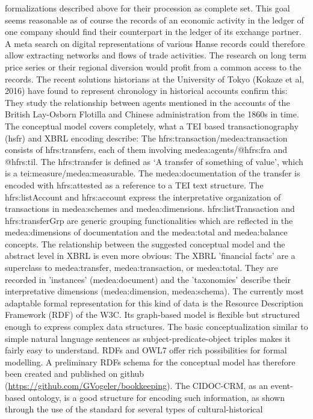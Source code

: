 \documentclass[12pt,a4paper]{article}
\begin{document}
formalizations described above for their procession as complete set. This goal seems reasonable
as of course the records of an economic activity in the ledger of one company should find their
counterpart in the ledger of its exchange partner. A meta search on digital representations of
various Hanse records could therefore allow extracting networks and flows of trade activities.
The research on long term price series or their regional diversion would profit from a common
access to the records. The recent solutions historians at the University of Tokyo (Kokaze et al,
2016) have found to represent chronology in historical accounts confirm this: They study the
relationship between agents mentioned in the accounts of the British Lay-Osborn Flotilla and
Chinese administration from the 1860s in time.
The conceptual model covers completely, what a TEI based transactionography (hsfr) and XBRL
encoding describe: The hfrs:transaction/medea:transaction consists of hfrs:transfers, each of
them involving medea:agents/@hfrs:fra and @hfrs:til. The hfrs:transfer is defined as ‘A transfer
of something of value’, which is a tei:measure/medea:measurable. The medea:documentation of
the transfer is encoded with hfrs:attested as a reference to a TEI text structure. The
hfrs:listAccount and hfrs:account express the interpretative organization of transactions in
medea:schemes and medea:dimensions. hfrs:listTransaction and hfrs:transferGrp are generic
grouping functionalities which are reflected in the medea:dimensions of documentation and the
medea:total and medea:balance concepts. The relationship between the suggested conceptual
model and the abstract level in XBRL is even more obvious: The XBRL 'financial facts' are a
superclass to medea:transfer, medea:transaction, or medea:total. They are recorded in 'instances'
(medea:document) and the 'taxonomies' describe their interpretative dimensions
(medea:dimension, medea:schema).
The currently most adaptable formal representation for this kind of data is the Resource
Description Framework (RDF) of the W3C. Its graph-based model is flexible but structured
enough to express complex data structures. The basic conceptualization similar to simple natural
language sentences as subject-predicate-object triples makes it fairly easy to understand. RDFs
and OWL7 offer rich possibilities for formal modelling. A preliminary RDFs schema for the
conceptual model has therefore been created and published on github
(\url{https://github.com/GVogeler/bookkeeping}).
The CIDOC-CRM, as an event-based ontology, is a good structure for encoding such
information, as shown through the use of the standard for several types of cultural-historical
\end{document}
